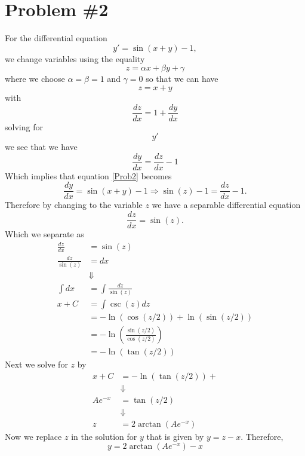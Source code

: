 \documentclass[11pt]{article}
\numberwithin{equation}{section}
\begin{document}
\section{Problem \#2}
For the differential equation 
\begin{equation}
y' = \sin(x+y) -1,
\label{Prob2}
\end{equation}
we change variables using the equality
$$z = \alpha x + \beta y + \gamma$$
where we choose $\alpha=\beta = 1$ and $\gamma = 0$ so that we can have
$$z = x + y$$
with
$$\frac{dz}{dx} = 1 + \frac{dy}{dx}$$
solving for $$y'$$ we see that we have
$$\frac{dy}{dx} = \frac{dz}{dx} - 1$$
Which implies that equation \ref{Prob2} becomes 
$$\frac{dy}{dx} = \sin(x+y) - 1 \Rightarrow \sin(z) -1 = \frac{dz}{dx} - 1.$$
Therefore by changing to the variable $z$ we have a separable differential equation
$$\frac{dz}{dx} = \sin(z).$$
Which we separate as
\begin{align*}
\frac{dz}{dx} &= \sin(z)\\
\frac{dz}{\sin(z)} &= dx\\
&\Downarrow\\
\int dx &= \int\frac{dz}{\sin(z)}\\
x+C &= \int\csc(z)dz\\
&= -\ln(\cos(z/2))+\ln(\sin(z/2))\\
&= -\ln\left(\frac{\sin(z/2)}{\cos(z/2)}\right)\\
&= -\ln(\tan(z/2))
\end{align*}
Next we solve for $z$ by 
\begin{align*}
x+C &= -\ln(\tan(z/2))+\\
&\Downarrow\\
Ae^{-x} &= \tan(z/2)\\
&\Downarrow\\
z &= 2\arctan\left(Ae^{-x}\right)
\end{align*}
Now we replace $z$ in the solution for $y$ that is given by $y=z-x$. Therefore,
$$y = 2\arctan\left(Ae^{-x}\right) - x$$

\pagebreak
\end{document}
